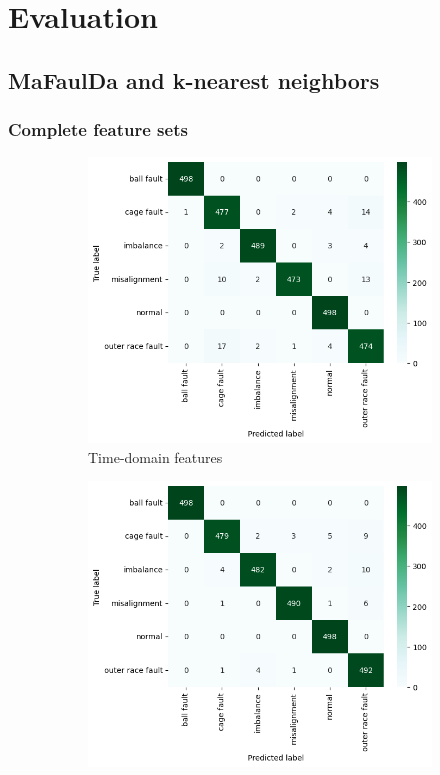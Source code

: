 \chapter{Evaluation} \label{section:evaluation} 


\section{MaFaulDa and k-nearest neighbors}

\subsection{Complete feature sets}
\begin{figure}[h]
    \centering
    \begin{subfigure}[b]{0.49\textwidth}
        \includegraphics[width=\textwidth]{assets/results/all-features/TD-confusion-matrix.png}
        \caption{Time-domain features}
    \end{subfigure}
    \hfill
    \begin{subfigure}[b]{0.49\textwidth}
        \includegraphics[width=\textwidth]{assets/results/all-features/FD-confusion-matrix.png}

\end{subfigure}
\end{figure}
